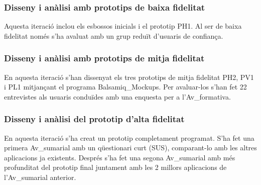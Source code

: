 \subsubsection{Disseny i anàlisi amb prototips de baixa fidelitat}
Aquesta iteració inclou els esbossos inicials i el prototip PH1. Al ser de baixa fidelitat només s'ha avaluat amb un grup reduït d'usuaris de confiança.
\subsubsection{Disseny i anàlisi amb prototips de mitja fidelitat}
En aquesta iteració s'han dissenyat els tres prototips de mitja fidelitat PH2, PV1 i PL1 mitjançant el programa \gls{Balsamiq_Mockups}. Per avaluar-los s'han fet 22 entrevistes als usuaris conduïdes amb una enquesta per a l'\gls{Av_formativa}.
\subsubsection{Disseny i anàlisi del prototip d'alta fidelitat}
En aquesta iteració s'ha creat un prototip completament programat. S'ha fet una primera \gls{Av_sumarial} amb un qüestionari curt (SUS), comparant-lo amb les altres aplicacions ja existents. Després s'ha fet una segona \gls{Av_sumarial} amb més profunditat del prototip final juntament amb les 2 millors aplicacions de l'\gls{Av_sumarial} anterior. 
